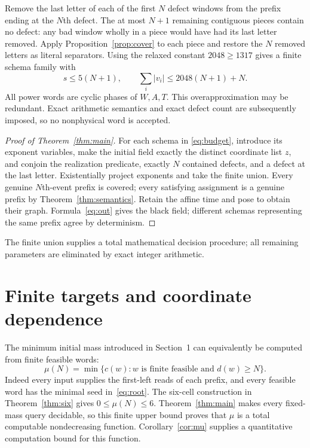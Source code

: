 \documentclass[11pt]{article}
\theoremstyle{remark}\newtheorem{remark}[theorem]{Remark}
\begin{document}
Remove the last letter of each of the first $N$ defect windows from the
prefix ending at the $N$th defect. The at most $N+1$ remaining contiguous
pieces contain no defect: any bad window wholly in a piece would have had
its last letter removed. Apply Proposition~\ref{prop:cover} to each piece
and restore the $N$ removed letters as literal separators. Using the relaxed
constant $2048\ge1317$ gives a finite schema family with
\begin{equation}\label{eq:budget}
 s\le5(N+1),\qquad\sum_i|v_i|\le2048(N+1)+N.
\end{equation}
All power words are cyclic phases of $W,A,T$. This overapproximation may be
redundant. Exact arithmetic semantics and exact defect count are subsequently
imposed, so no nonphysical word is accepted.

\begin{proof}[Proof of Theorem~\ref{thm:main}]
For each schema in \eqref{eq:budget}, introduce its exponent variables, make
the initial field exactly the distinct coordinate list $z$, and conjoin the
realization predicate, exactly $N$ contained defects, and a defect at the last
letter. Existentially project exponents and take the finite union.
Every genuine $N$th-event prefix is covered; every satisfying assignment is a
genuine prefix by Theorem~\ref{thm:semantics}. Retain the affine time and pose
to obtain their graph. Formula~\eqref{eq:out} gives the black field; different
schemas representing the same prefix agree by determinism.
\end{proof}

The finite union supplies a total mathematical decision procedure; all
remaining parameters are eliminated by exact integer arithmetic.









\section{Finite targets and coordinate dependence}
The minimum initial mass introduced in Section~1 can equivalently be
computed from finite feasible words:
\[
 \mu(N)=\min\{c(w):w\text{ is finite feasible and }d(w)\ge N\}.
\]
Indeed every input supplies the first-left reads of each prefix, and every
feasible word has the minimal seed in~\eqref{eq:root}.
The six-cell construction in Theorem~\ref{thm:six} gives $0\le\mu(N)\le6$.
Theorem~\ref{thm:main} makes every fixed-mass query decidable, so this finite
upper bound proves that $\mu$ is a total computable nondecreasing function.
Corollary~\ref{cor:mu} supplies a quantitative computation bound for this function.
\end{document}
